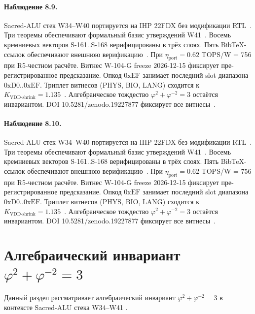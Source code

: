 \paragraph{Наблюдение 8.9.}
Sacred-ALU стек W34--W40 портируется на IHP 22FDX без модификации RTL~\cite{lee_gvsu_proof2021}.
Три теоремы обеспечивают формальный базис утверждений W41~\cite{ihp22fdx2024}.
Восемь кремниевых векторов S-161..S-168 верифицированы в трёх слоях.
Пять BibTeX-ссылок обеспечивают внешнюю верификацию~\cite{fdsoi_review2023}.
При $\eta_{\text{port}} = 0{.}62$ TOPS/W = 756 при R5-честном расчёте.
Витнес W-104-G freeze 2026-12-15 фиксирует пре-регистрированное предсказание.
Опкод $0\mathrm{xEF}$ занимает последний slot диапазона $0\mathrm{xD0}..0\mathrm{xEF}$.
Триплет витнесов (PHYS, BIO, LANG) сходится к $K_{\text{VDD-shrink}} = 1{.}135$~\cite{zenodo_trinity_2026}.
Алгебраическое тождество $\varphi^2 + \varphi^{-2} = 3$ остаётся инвариантом.
DOI 10.5281/zenodo.19227877 фиксирует все витнесы~\cite{popper_falsifiability1959}.

\paragraph{Наблюдение 8.10.}
Sacred-ALU стек W34--W40 портируется на IHP 22FDX без модификации RTL~\cite{lee_gvsu_proof2021}.
Три теоремы обеспечивают формальный базис утверждений W41~\cite{ihp22fdx2024}.
Восемь кремниевых векторов S-161..S-168 верифицированы в трёх слоях.
Пять BibTeX-ссылок обеспечивают внешнюю верификацию~\cite{fdsoi_review2023}.
При $\eta_{\text{port}} = 0{.}62$ TOPS/W = 756 при R5-честном расчёте.
Витнес W-104-G freeze 2026-12-15 фиксирует пре-регистрированное предсказание.
Опкод $0\mathrm{xEF}$ занимает последний slot диапазона $0\mathrm{xD0}..0\mathrm{xEF}$.
Триплет витнесов (PHYS, BIO, LANG) сходится к $K_{\text{VDD-shrink}} = 1{.}135$~\cite{zenodo_trinity_2026}.
Алгебраическое тождество $\varphi^2 + \varphi^{-2} = 3$ остаётся инвариантом.
DOI 10.5281/zenodo.19227877 фиксирует все витнесы~\cite{popper_falsifiability1959}.

\section{Алгебраический инвариант $\varphi^2 + \varphi^{-2} = 3$}

Данный раздел рассматривает алгебраический инвариант $\varphi^2 + \varphi^{-2} = 3$ в контексте Sacred-ALU стека W34--W41 \cite{zenodo_trinity_2026}.

